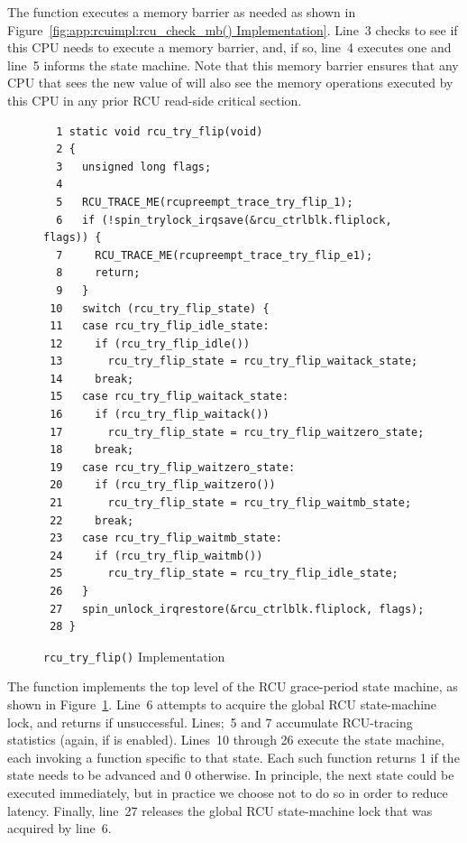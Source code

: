 The  function executes a memory barrier
as needed as shown in
Figure~\ref{fig:app:rcuimpl:rcu_check_mb() Implementation}.
Line~3 checks to see if this CPU needs to execute a memory barrier,
and, if so, line~4 executes one and line~5 informs the state
machine.
Note that this memory barrier ensures that any CPU that sees the new
value of  will also see the memory operations
executed by this CPU in any prior RCU read-side critical section.

\begin{figure}[tbp]
{ \scriptsize
\begin{verbatim}
  1 static void rcu_try_flip(void)
  2 {
  3   unsigned long flags;
  4
  5   RCU_TRACE_ME(rcupreempt_trace_try_flip_1);
  6   if (!spin_trylock_irqsave(&rcu_ctrlblk.fliplock, flags)) {
  7     RCU_TRACE_ME(rcupreempt_trace_try_flip_e1);
  8     return;
  9   }
 10   switch (rcu_try_flip_state) {
 11   case rcu_try_flip_idle_state:
 12     if (rcu_try_flip_idle())
 13       rcu_try_flip_state = rcu_try_flip_waitack_state;
 14     break;
 15   case rcu_try_flip_waitack_state:
 16     if (rcu_try_flip_waitack())
 17       rcu_try_flip_state = rcu_try_flip_waitzero_state;
 18     break;
 19   case rcu_try_flip_waitzero_state:
 20     if (rcu_try_flip_waitzero())
 21       rcu_try_flip_state = rcu_try_flip_waitmb_state;
 22     break;
 23   case rcu_try_flip_waitmb_state:
 24     if (rcu_try_flip_waitmb())
 25       rcu_try_flip_state = rcu_try_flip_idle_state;
 26   }
 27   spin_unlock_irqrestore(&rcu_ctrlblk.fliplock, flags);
 28 }
\end{verbatim}
}
\caption{{\tt rcu\_try\_flip()} Implementation}
\label{fig:app:rcuimpl:rcu_try_flip() Implementation}
\end{figure}

The  function implements the top level of
the RCU grace-period state machine, as shown in
Figure~\ref{fig:app:rcuimpl:rcu_try_flip() Implementation}.
Line~6 attempts to acquire the global RCU state-machine lock,
and returns if unsuccessful.
Lines;~5 and 7 accumulate RCU-tracing statistics (again, if
 is enabled).
Lines~10 through 26 execute the state machine,
each invoking a function specific to that state.
Each such function returns 1 if the state needs to be advanced and
0 otherwise.
In principle, the next state could be executed immediately,
but in practice we choose not to do so in order to reduce latency.
Finally, line~27 releases the global RCU state-machine lock
that was acquired by line~6.

